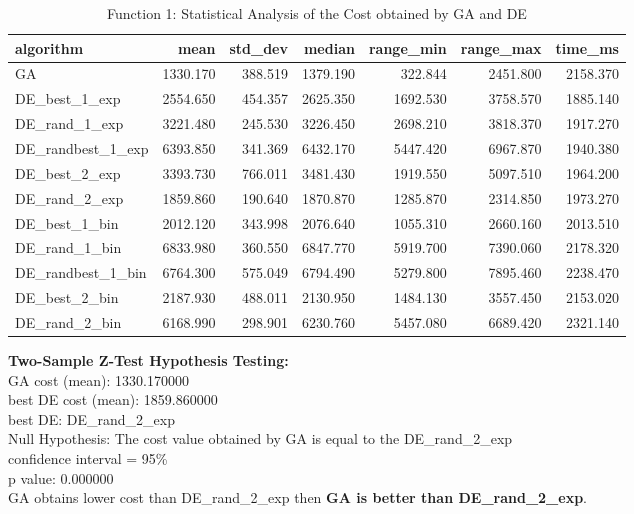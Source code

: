 \documentclass[12pt]{article}
\begin{document}
\begin{table}[H]
\centering
\footnotesize
\begin{tabular}{lrrrrrr}
    \toprule
    algorithm &     mean &  std\_dev &   median &  range\_min &  range\_max &  time\_ms \\
    \midrule
    GA & 1330.170 &  388.519 & 1379.190 &    322.844 &   2451.800 & 2158.370 \\
    DE\_best\_1\_exp & 2554.650 &  454.357 & 2625.350 &   1692.530 &   3758.570 & 1885.140 \\
    DE\_rand\_1\_exp & 3221.480 &  245.530 & 3226.450 &   2698.210 &   3818.370 & 1917.270 \\
    DE\_randbest\_1\_exp & 6393.850 &  341.369 & 6432.170 &   5447.420 &   6967.870 & 1940.380 \\
    DE\_best\_2\_exp & 3393.730 &  766.011 & 3481.430 &   1919.550 &   5097.510 & 1964.200 \\
    DE\_rand\_2\_exp & 1859.860 &  190.640 & 1870.870 &   1285.870 &   2314.850 & 1973.270 \\
    DE\_best\_1\_bin & 2012.120 &  343.998 & 2076.640 &   1055.310 &   2660.160 & 2013.510 \\
    DE\_rand\_1\_bin & 6833.980 &  360.550 & 6847.770 &   5919.700 &   7390.060 & 2178.320 \\
    DE\_randbest\_1\_bin & 6764.300 &  575.049 & 6794.490 &   5279.800 &   7895.460 & 2238.470 \\
    DE\_best\_2\_bin & 2187.930 &  488.011 & 2130.950 &   1484.130 &   3557.450 & 2153.020 \\
    DE\_rand\_2\_bin & 6168.990 &  298.901 & 6230.760 &   5457.080 &   6689.420 & 2321.140 \\
    \bottomrule
\end{tabular}
\caption{Function 1: Statistical Analysis of the Cost obtained by GA and DE} 
\end{table}

\noindent
\textbf{Two-Sample Z-Test Hypothesis Testing:}\\
GA cost (mean): 1330.170000\\
best DE cost (mean): 1859.860000\\
best DE: DE\_rand\_2\_exp\\
Null Hypothesis: The cost value obtained by GA is equal to the DE\_rand\_2\_exp\\
confidence interval = 95\%\\
p value: 0.000000\\
GA obtains lower cost than DE\_rand\_2\_exp then \textbf{GA is better than DE\_rand\_2\_exp}.\\
\end{document}
